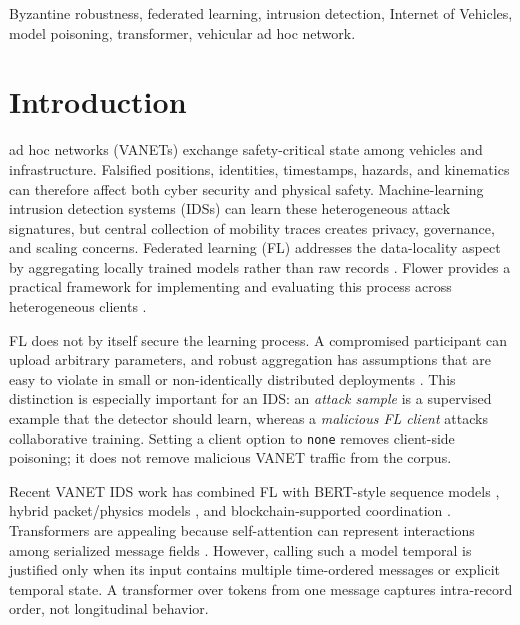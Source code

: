 \documentclass[journal]{IEEEtran}
\begin{document}
\begin{IEEEkeywords}
Byzantine robustness, federated learning, intrusion detection, Internet of Vehicles, model poisoning, transformer, vehicular ad hoc network.
\end{IEEEkeywords}

\section{Introduction}
 ad hoc networks (VANETs) exchange safety-critical state among vehicles and infrastructure. Falsified positions, identities, timestamps, hazards, and kinematics can therefore affect both cyber security and physical safety. Machine-learning intrusion detection systems (IDSs) can learn these heterogeneous attack signatures, but central collection of mobility traces creates privacy, governance, and scaling concerns. Federated learning (FL) addresses the data-locality aspect by aggregating locally trained models rather than raw records \cite{mcmahan2017communication,kairouz2021advances}. Flower provides a practical framework for implementing and evaluating this process across heterogeneous clients \cite{beutel2020flower}.

FL does not by itself secure the learning process. A compromised participant can upload arbitrary parameters, and robust aggregation has assumptions that are easy to violate in small or non-identically distributed deployments \cite{yin2018byzantine,fang2020local}. This distinction is especially important for an IDS: an \emph{attack sample} is a supervised example that the detector should learn, whereas a \emph{malicious FL client} attacks collaborative training. Setting a client option to \texttt{none} removes client-side poisoning; it does not remove malicious VANET traffic from the corpus.

Recent VANET IDS work has combined FL with BERT-style sequence models \cite{ahsan2024privacy}, hybrid packet/physics models \cite{chen2024fast}, and blockchain-supported coordination \cite{mansouri2025distributed}. Transformers are appealing because self-attention can represent interactions among serialized message fields \cite{vaswani2017attention,devlin2019bert}. However, calling such a model temporal is justified only when its input contains multiple time-ordered messages or explicit temporal state. A transformer over tokens from one message captures intra-record order, not longitudinal behavior.
\end{document}
